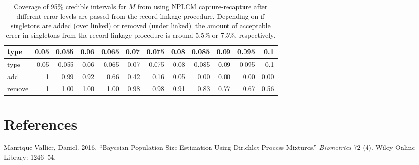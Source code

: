\documentclass[]{article}
\begin{document}
\begin{longtable}[]{@{}lrrrrrrrrrrr@{}}
\caption{\label{tab:rl-zoom-results}Coverage of 95\% credible intervals
for \(M\) from using NPLCM capture-recapture after different error
levels are passed from the record linkage procedure. Depending on if
singletons are added (over linked) or removed (under linked), the amount
of acceptable error in singletons from the record linkage procedure is
around 5.5\% or 7.5\%, respectively.}\tabularnewline
\toprule
type & 0.05 & 0.055 & 0.06 & 0.065 & 0.07 & 0.075 & 0.08 & 0.085 & 0.09
& 0.095 & 0.1\tabularnewline
\midrule
\endfirsthead
\toprule
type & 0.05 & 0.055 & 0.06 & 0.065 & 0.07 & 0.075 & 0.08 & 0.085 & 0.09
& 0.095 & 0.1\tabularnewline
\midrule
\endhead
add & 1 & 0.99 & 0.92 & 0.66 & 0.42 & 0.16 & 0.05 & 0.00 & 0.00 & 0.00 &
0.00\tabularnewline
remove & 1 & 1.00 & 1.00 & 1.00 & 0.98 & 0.98 & 0.91 & 0.83 & 0.77 &
0.67 & 0.56\tabularnewline
\bottomrule
\end{longtable}

\hypertarget{references}{%
\section*{References}\label{references}}

\hypertarget{refs}{}
\leavevmode\hypertarget{ref-manrique2016bayesian}{}%
Manrique-Vallier, Daniel. 2016. ``Bayesian Population Size Estimation
Using Dirichlet Process Mixtures.'' \emph{Biometrics} 72 (4). Wiley
Online Library: 1246--54.
\end{document}
